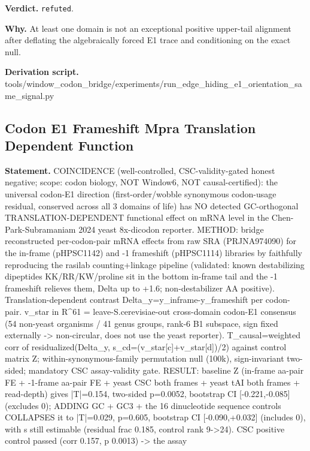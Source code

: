 \textbf{Verdict.} \texttt{refuted}.

\textbf{Why.} At least one domain is not an exceptional positive upper-tail alignment after deflating the
algebraically forced E1 trace and conditioning on the exact null.

\textbf{Derivation script.} tools/window\_codon\_bridge/experiments/run\_edge\_hiding\_e1\_orientation\_same\_signal.py

\subsection{Codon E1 Frameshift Mpra Translation Dependent Function}\label{sec:bridge-codon-e1-frameshift-mpra-translation-dependent-function}
\textbf{Statement.} COINCIDENCE (well-controlled, CSC-validity-gated honest negative; scope: codon biology, NOT Window6,
NOT causal-certified): the universal codon-E1 direction (first-order/wobble synonymous codon-usage
residual, conserved across all 3 domains of life) has NO detected GC-orthogonal
TRANSLATION-DEPENDENT functional effect on mRNA level in the Chen-Park-Subramaniam 2024 yeast
8x-dicodon reporter. METHOD: bridge reconstructed per-codon-pair mRNA effects from raw SRA
(PRJNA974090) for the in-frame (pHPSC1142) and -1 frameshift (pHPSC1114) libraries by faithfully
reproducing the rasilab counting+linkage pipeline (validated: known destabilizing dipeptides
KK/RR/KW/proline sit in the bottom in-frame tail and the -1 frameshift relieves them, Delta up to
+1.6; non-destabilizer AA positive). Translation-dependent contrast
Delta\_y=y\_inframe-y\_frameshift per codon-pair. v\_star in R\textasciicircum{}61 =
leave-S.cerevisiae-out cross-domain codon-E1 consensus (54 non-yeast organisms / 41 genus groups,
rank-6 B1 subspace, sign fixed externally -> non-circular, does not use the yeast reporter).
T\_causal=weighted corr of residualized(Delta\_y, s\_cd=(v\_star[c]+v\_star[d])/2) against control
matrix Z; within-synonymous-family permutation null (100k), sign-invariant two-sided; mandatory CSC
assay-validity gate. RESULT: baseline Z (in-frame aa-pair FE + -1-frame aa-pair FE + yeast CSC both
frames + yeast tAI both frames + read-depth) gives |T|=0.154, two-sided p=0.0052, bootstrap CI
[-0.221,-0.085] (excludes 0); ADDING GC + GC3 + the 16 dinucleotide sequence controls COLLAPSES it
to |T|=0.029, p=0.605, bootstrap CI [-0.090,+0.032] (includes 0), with s still estimable (residual
frac 0.185, control rank 9->24). CSC positive control passed (corr 0.157, p 0.0013) -> the assay
